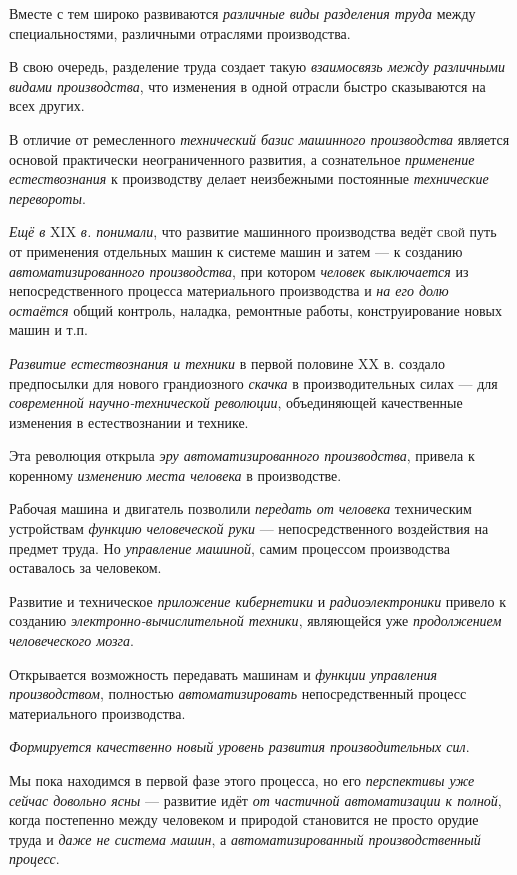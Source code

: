 \documentclass[a4paper,14pt,russian]{extreport}
\begin{document}
Вместе с тем широко развиваются \emph{различные виды разделения труда} между специальностями, различными отраслями производства.

В свою очередь, разделение труда создает такую \emph{взаимосвязь между различными видами производства}, что изменения в одной отрасли быстро сказываются на всех других.

В отличие от ремесленного \emph{технический базис машинного производства} является основой практически неограниченного развития, а сознательное \emph{применение естествознания} к производству делает неизбежными постоянные \emph{технические перевороты}.

\emph{Ещё в} XIX \emph{в. понимали}, что развитие машинного производства ведёт \textsc{свой} путь от применения отдельных машин к системе машин и затем --- к созданию \emph{автоматизированного производства}, при котором \emph{человек выключается} из непосредственного процесса материального производства и \emph{на его долю остаётся} общий контроль, наладка, ремонтные работы, конструирование новых машин и т.п.

\emph{Развитие естествознания и техники} в первой половине XX в. создало предпосылки для нового грандиозного \emph{скачка} в производительных силах --- для \emph{современной научно-технической революции}, объединяющей качественные изменения в естествознании и технике.

Эта революция открыла \emph{эру автоматизированного производства}, привела к коренному \emph{изменению места человека} в производстве.

Рабочая машина и двигатель позволили \emph{передать от человека} техническим устройствам \emph{функцию человеческой руки} --- непосредственного воздействия на предмет труда. Но \emph{управление машиной}, самим процессом производства оставалось за человеком.

Развитие и техническое \emph{приложение кибернетики} и \emph{радиоэлектроники} привело к созданию \emph{электронно-вычислительной техники}, являющейся уже \emph{продолжением человеческого мозга}.

Открывается возможность передавать машинам и \emph{функции управления производством}, полностью \emph{автоматизировать} непосредственный процесс материального производства.

\emph{Формируется качественно новый уровень развития производительных сил}.

Мы пока находимся в первой фазе этого процесса, но его \emph{перспективы уже сейчас довольно ясны} --- развитие идёт \emph{от частичной автоматизации к полной}, когда постепенно между человеком и природой становится не просто орудие труда и \emph{даже не система машин}, а \emph{автоматизированный производственный процесс}.
\end{document}
